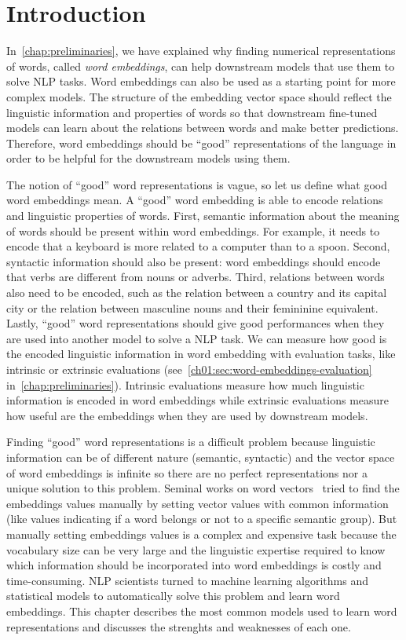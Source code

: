 \section{Introduction}
  In~\autoref{chap:preliminaries}, we have explained why finding numerical
  representations of words, called \textit{word embeddings}, can help
  downstream models that use them to solve NLP tasks. Word embeddings can also
  be used as a starting point for more complex models. The structure of the
  embedding vector space should reflect the linguistic information and
  properties of words so that downstream fine-tuned models can learn about the
  relations between words and make better predictions. Therefore, word
  embeddings should be ``good'' representations of the language in order to be
  helpful for the downstream models using them.\medskip

  The notion of ``good'' word representations is vague, so let us define what
  good word embeddings mean. A ``good'' word embedding is able to encode
  relations and linguistic properties of words. First, semantic information
  about the meaning of words should be present within word embeddings. For
  example, it needs to encode that a keyboard is more related to a computer than
  to a spoon. Second, syntactic information should also be present: word
  embeddings should encode that verbs are different from nouns or adverbs.
  Third, relations between words also need to be encoded, such as the relation
  between a country and its capital city or the relation between masculine nouns
  and their femininine equivalent. Lastly, ``good'' word representations should
  give good performances when they are used into another model to solve a NLP
  task. We can measure how good is the encoded linguistic information in word
  embedding with evaluation tasks, like intrinsic or extrinsic evaluations
  (see~\autoref{ch01:sec:word-embeddings-evaluation}
  in~\autoref{chap:preliminaries}). Intrinsic evaluations measure how much
  linguistic information is encoded in word embeddings while extrinsic
  evaluations measure how useful are the embeddings when they are used by
  downstream models.\medskip

  Finding ``good'' word representations is a difficult problem because
  linguistic information can be of different nature (semantic, syntactic) and
  the vector space of word embeddings is infinite so there are no perfect
  representations nor a unique solution to this problem. Seminal works on word
  vectors~\citep{osgood1964semantic, bierwisch1970classifying} tried to find the
  embeddings values manually by setting vector values with common information
  (like values indicating if a word belongs or not to a specific semantic
  group). But manually setting embeddings values is a complex and expensive task
  because the vocabulary size can be very large and the linguistic expertise
  required to know which information should be incorporated into word embeddings
  is costly and time-consuming. NLP scientists turned to machine learning
  algorithms and statistical models to automatically solve this problem and
  learn word embeddings. This chapter describes the most common models used to
  learn word representations and discusses the strenghts and weaknesses of each
  one.

